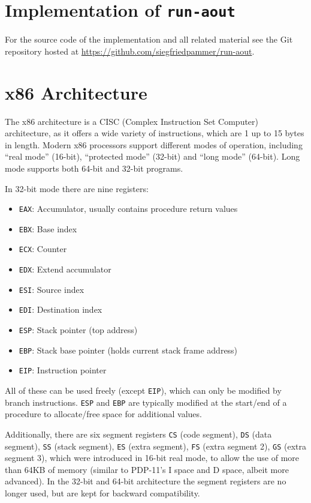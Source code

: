 \documentclass[draft,final]{vutinfth} %
\begin{document}
\section{Implementation of \texttt{run-aout}}
\label{impl}

For the source code of the implementation and all related material see the Git repository hosted at \url{https://github.com/siegfriedpammer/run-aout}.

\section{x86 Architecture}
\label{x86arch}

The x86 architecture is a CISC (Complex Instruction Set Computer) architecture, as it offers a wide variety of instructions, which are 1 up to 15 bytes in length. Modern x86 processors support different modes of operation, including ``real mode'' (16-bit), ``protected mode'' (32-bit) and ``long mode'' (64-bit). Long mode supports both 64-bit and 32-bit programs.

In 32-bit mode there are nine registers:

\begin{itemize}
    \item \texttt{EAX}: Accumulator, usually contains procedure return values
    \item \texttt{EBX}: Base index
    \item \texttt{ECX}: Counter
    \item \texttt{EDX}: Extend accumulator
    \item \texttt{ESI}: Source index
    \item \texttt{EDI}: Destination index
    \item \texttt{ESP}: Stack pointer (top address)
    \item \texttt{EBP}: Stack base pointer (holds current stack frame address)
    \item \texttt{EIP}: Instruction pointer
\end{itemize}

All of these can be used freely (except \texttt{EIP}), which can only be modified by branch instructions. \texttt{ESP} and \texttt{EBP} are typically modified at the start/end of a procedure to allocate/free space for additional values.

Additionally, there are six segment registers \texttt{CS} (code segment), \texttt{DS} (data segment), \texttt{SS} (stack segment), \texttt{ES} (extra segment), \texttt{FS} (extra segment 2), \texttt{GS} (extra segment 3), which were introduced in 16-bit real mode, to allow the use of more than 64KB of memory (similar to PDP-11's I space and D space, albeit more advanced). In the 32-bit and 64-bit architecture the segment registers are no longer used, but are kept for backward compatibility.
\end{document}
